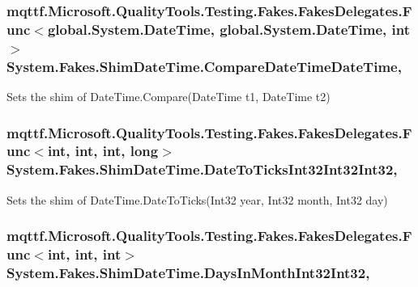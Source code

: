 \hypertarget{class_system_1_1_fakes_1_1_shim_date_time_a1381e1c06d3859965be1574c6a1351aa}{
\subsubsection[{Compare\-Date\-Time\-Date\-Time}]{\setlength{\rightskip}{0pt plus 5cm}mqttf.\-Microsoft.\-Quality\-Tools.\-Testing.\-Fakes.\-Fakes\-Delegates.\-Func$<$global.\-System.\-Date\-Time, global.\-System.\-Date\-Time, int$>$ System.\-Fakes.\-Shim\-Date\-Time.\-Compare\-Date\-Time\-Date\-Time\hspace{0.3cm}{\ttfamily [static]}, {\ttfamily [set]}}}\label{class_system_1_1_fakes_1_1_shim_date_time_a1381e1c06d3859965be1574c6a1351aa}


Sets the shim of Date\-Time.\-Compare(\-Date\-Time t1, Date\-Time t2)

\hypertarget{class_system_1_1_fakes_1_1_shim_date_time_a57df748b5c1c93bd0bbc6a9a864dfcf8}{
\subsubsection[{Date\-To\-Ticks\-Int32\-Int32\-Int32}]{\setlength{\rightskip}{0pt plus 5cm}mqttf.\-Microsoft.\-Quality\-Tools.\-Testing.\-Fakes.\-Fakes\-Delegates.\-Func$<$int, int, int, long$>$ System.\-Fakes.\-Shim\-Date\-Time.\-Date\-To\-Ticks\-Int32\-Int32\-Int32\hspace{0.3cm}{\ttfamily [static]}, {\ttfamily [set]}}}\label{class_system_1_1_fakes_1_1_shim_date_time_a57df748b5c1c93bd0bbc6a9a864dfcf8}


Sets the shim of Date\-Time.\-Date\-To\-Ticks(\-Int32 year, Int32 month, Int32 day)

\hypertarget{class_system_1_1_fakes_1_1_shim_date_time_a3510e5aa586dbea32408bcc2352e90d9}{
\subsubsection[{Days\-In\-Month\-Int32\-Int32}]{\setlength{\rightskip}{0pt plus 5cm}mqttf.\-Microsoft.\-Quality\-Tools.\-Testing.\-Fakes.\-Fakes\-Delegates.\-Func$<$int, int, int$>$ System.\-Fakes.\-Shim\-Date\-Time.\-Days\-In\-Month\-Int32\-Int32\hspace{0.3cm}{\ttfamily [static]}, {\ttfamily [set]}}}\label{class_system_1_1_fakes_1_1_shim_date_time_a3510e5aa586dbea32408bcc2352e90d9}


